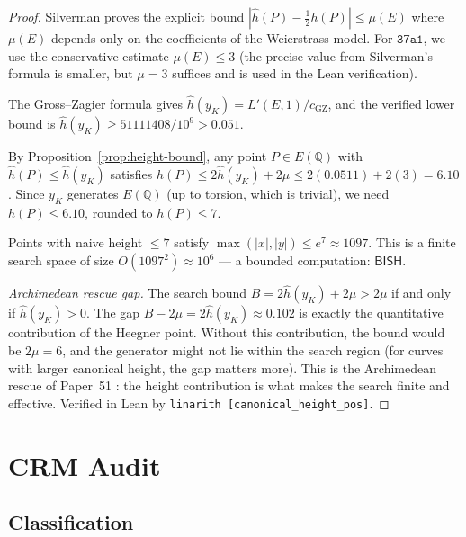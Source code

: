 \documentclass[11pt]{article}
\theoremstyle{plain}
\theoremstyle{definition}
\theoremstyle{remark}
\newcommand{\Q}{\mathbb{Q}}
\newcommand{\BISH}{\ensuremath{\mathsf{BISH}}}
\newcommand{\hhat}{\hat{h}}
\begin{document}
\begin{proof}
Silverman \cite{silverman-heights} proves the explicit bound $|\hhat(P) - \tfrac{1}{2}h(P)| \leq \mu(E)$ where $\mu(E)$ depends only on the coefficients of the Weierstrass model. For $\texttt{37a1}$, we use the conservative estimate $\mu(E) \leq 3$ (the precise value from Silverman's formula is smaller, but $\mu = 3$ suffices and is used in the Lean verification).

The Gross--Zagier formula gives $\hhat(y_K) = L'(E,1)/c_{\mathrm{GZ}}$, and the verified lower bound is $\hhat(y_K) \geq 51111408/10^9 > 0.051$.

By Proposition~\ref{prop:height-bound}, any point $P \in E(\Q)$ with $\hhat(P) \leq \hhat(y_K)$ satisfies $h(P) \leq 2\hhat(y_K) + 2\mu \leq 2(0.0511) + 2(3) = 6.10$. Since $y_K$ generates $E(\Q)$ (up to torsion, which is trivial), we need $h(P) \leq 6.10$, rounded to $h(P) \leq 7$.

Points with naive height $\leq 7$ satisfy $\max(|x|, |y|) \leq e^7 \approx 1097$. This is a finite search space of size $O(1097^2) \approx 10^6$ --- a bounded computation: $\BISH$.

\emph{Archimedean rescue gap.} The search bound $B = 2\hhat(y_K) + 2\mu > 2\mu$ if and only if $\hhat(y_K) > 0$. The gap $B - 2\mu = 2\hhat(y_K) \approx 0.102$ is exactly the quantitative contribution of the Heegner point. Without this contribution, the bound would be $2\mu = 6$, and the generator might not lie within the search region (for curves with larger canonical height, the gap matters more). This is the Archimedean rescue of Paper~51 \cite{paper51}: the height contribution is what makes the search finite and effective. Verified in Lean by \texttt{linarith [canonical\_height\_pos]}.
\end{proof}


\section{CRM Audit}
\label{sec:audit}

\subsection{Classification}
\end{document}
